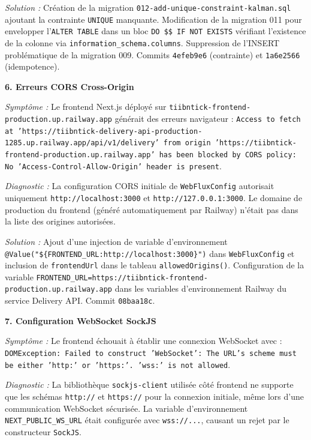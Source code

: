 \textit{Solution :} Création de la migration \texttt{012-add-unique-constraint-kalman.sql} ajoutant la contrainte \texttt{UNIQUE} manquante. Modification de la migration 011 pour envelopper l'\texttt{ALTER TABLE} dans un bloc \texttt{DO \$\$ IF NOT EXISTS} vérifiant l'existence de la colonne via \texttt{information\_schema.columns}. Suppression de l'INSERT problématique de la migration 009. Commits \texttt{4efeb9e6} (contrainte) et \texttt{1a6e2566} (idempotence).

\textbf{6. Erreurs CORS Cross-Origin}

\textit{Symptôme :} Le frontend Next.js déployé sur \texttt{tiibntick-frontend-production.up.railway.app} générait des erreurs navigateur : \texttt{Access to fetch at 'https://tiibntick-delivery-api-production-1285.up.railway.app/api/v1/delivery' from origin 'https://tiibntick-frontend-production.up.railway.app' has been blocked by CORS policy: No 'Access-Control-Allow-Origin' header is present}.

\textit{Diagnostic :} La configuration CORS initiale de \texttt{WebFluxConfig} autorisait uniquement \texttt{http://localhost:3000} et \texttt{http://127.0.0.1:3000}. Le domaine de production du frontend (généré automatiquement par Railway) n'était pas dans la liste des origines autorisées.

\textit{Solution :} Ajout d'une injection de variable d'environnement \texttt{@Value("\$\{FRONTEND\_URL:http://localhost:3000\}")} dans \texttt{WebFluxConfig} et inclusion de \texttt{frontendUrl} dans le tableau \texttt{allowedOrigins()}. Configuration de la variable \texttt{FRONTEND\_URL=https://tiibntick-frontend-production.up.railway.app} dans les variables d'environnement Railway du service Delivery API. Commit \texttt{08baa18c}.

\textbf{7. Configuration WebSocket SockJS}

\textit{Symptôme :} Le frontend échouait à établir une connexion WebSocket avec : \texttt{DOMException: Failed to construct 'WebSocket': The URL's scheme must be either 'http:' or 'https:'. 'wss:' is not allowed}.

\textit{Diagnostic :} La bibliothèque \texttt{sockjs-client} utilisée côté frontend ne supporte que les schémas \texttt{http://} et \texttt{https://} pour la connexion initiale, même lors d'une communication WebSocket sécurisée. La variable d'environnement \texttt{NEXT\_PUBLIC\_WS\_URL} était configurée avec \texttt{wss://...}, causant un rejet par le constructeur \texttt{SockJS}.


